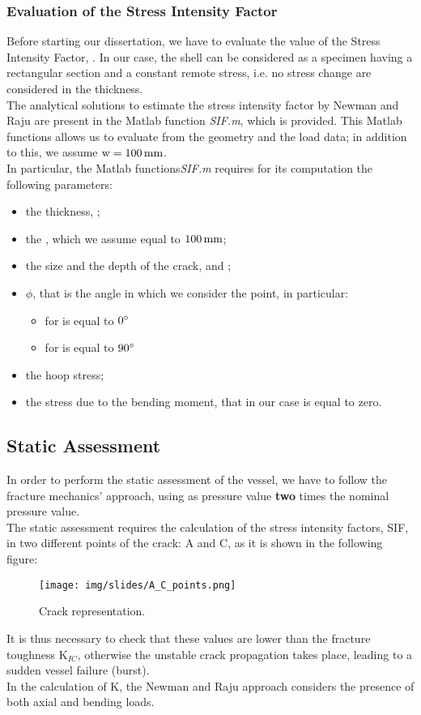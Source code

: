 \documentclass[a4paper,12pt]{article}
\begin{document}
\subsubsection*{Evaluation of the Stress Intensity Factor}

Before starting our dissertation, we have to evaluate the value of the Stress Intensity Factor, . In our case, the shell can be considered as a specimen having a rectangular section and a constant remote stress, i.e. no stress change are considered in the thickness.
\\The analytical solutions to estimate the stress intensity factor  by Newman and Raju are present in the Matlab function \emph{SIF.m}, which is provided.
This Matlab functions allows us to evaluate  from the geometry and the load data; in addition to this, we assume  $\text{w}= 100 \,\text{mm}$.\\
In particular, the Matlab functions\emph{SIF.m} requires for its computation the following parameters:

\begin{itemize}
\item the thickness, ;
\item the , which we assume equal to $100 \,\text{mm}$;
\item the size and the depth of the crack,  and ;
\item $\phi$, that is the angle in which we consider the point, in particular: \begin{itemize}
\item for  is equal to $0 \degree$
\item for  is equal to $90 \degree$
\end{itemize}  
\item the hoop stress;
\item the stress due to the bending moment, that in our case is equal to zero.
\end{itemize}


\subsection{Static Assessment}

In order to perform the static assessment of the vessel, we have to follow the fracture mechanics' approach, using as pressure value \textbf{two} times the nominal pressure value.\\
The static assessment requires the calculation of the stress intensity factors, SIF, in two different points of the crack: A and C, as it is shown in the following figure:
\begin{figure}[H]
\centering
\texttt{[image: img/slides/A\_C\_points.png]}
\caption{Crack representation.}
\end{figure}
 It is thus necessary to check that these values are lower than the fracture toughness $\text{K}_{IC}$, otherwise the unstable crack propagation takes place, leading to a sudden vessel failure (burst).\\In the calculation of K, the Newman and Raju approach considers the presence of both axial and bending loads.
\end{document}

